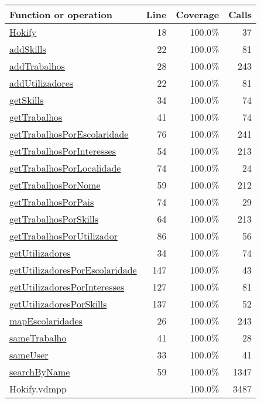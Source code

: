 \bigskip
\begin{longtable}{|l|r|r|r|}
\hline
Function or operation & Line & Coverage & Calls \\
\hline
\hline
\hyperref[Hokify:18]{Hokify} & 18&100.0\% & 37 \\
\hline
\hyperref[addSkills:22]{addSkills} & 22&100.0\% & 81 \\
\hline
\hyperref[addTrabalhos:28]{addTrabalhos} & 28&100.0\% & 243 \\
\hline
\hyperref[addUtilizadores:22]{addUtilizadores} & 22&100.0\% & 81 \\
\hline
\hyperref[getSkills:34]{getSkills} & 34&100.0\% & 74 \\
\hline
\hyperref[getTrabalhos:41]{getTrabalhos} & 41&100.0\% & 74 \\
\hline
\hyperref[getTrabalhosPorEscolaridade:76]{getTrabalhosPorEscolaridade} & 76&100.0\% & 241 \\
\hline
\hyperref[getTrabalhosPorInteresses:54]{getTrabalhosPorInteresses} & 54&100.0\% & 213 \\
\hline
\hyperref[getTrabalhosPorLocalidade:74]{getTrabalhosPorLocalidade} & 74&100.0\% & 24 \\
\hline
\hyperref[getTrabalhosPorNome:59]{getTrabalhosPorNome} & 59&100.0\% & 212 \\
\hline
\hyperref[getTrabalhosPorPais:74]{getTrabalhosPorPais} & 74&100.0\% & 29 \\
\hline
\hyperref[getTrabalhosPorSkills:64]{getTrabalhosPorSkills} & 64&100.0\% & 213 \\
\hline
\hyperref[getTrabalhosPorUtilizador:86]{getTrabalhosPorUtilizador} & 86&100.0\% & 56 \\
\hline
\hyperref[getUtilizadores:34]{getUtilizadores} & 34&100.0\% & 74 \\
\hline
\hyperref[getUtilizadoresPorEscolaridade:147]{getUtilizadoresPorEscolaridade} & 147&100.0\% & 43 \\
\hline
\hyperref[getUtilizadoresPorInteresses:127]{getUtilizadoresPorInteresses} & 127&100.0\% & 81 \\
\hline
\hyperref[getUtilizadoresPorSkills:137]{getUtilizadoresPorSkills} & 137&100.0\% & 52 \\
\hline
\hyperref[mapEscolaridades:26]{mapEscolaridades} & 26&100.0\% & 243 \\
\hline
\hyperref[sameTrabalho:41]{sameTrabalho} & 41&100.0\% & 28 \\
\hline
\hyperref[sameUser:33]{sameUser} & 33&100.0\% & 41 \\
\hline
\hyperref[searchByName:59]{searchByName} & 59&100.0\% & 1347 \\
\hline
\hline
Hokify.vdmpp & & 100.0\% & 3487 \\
\hline
\end{longtable}

